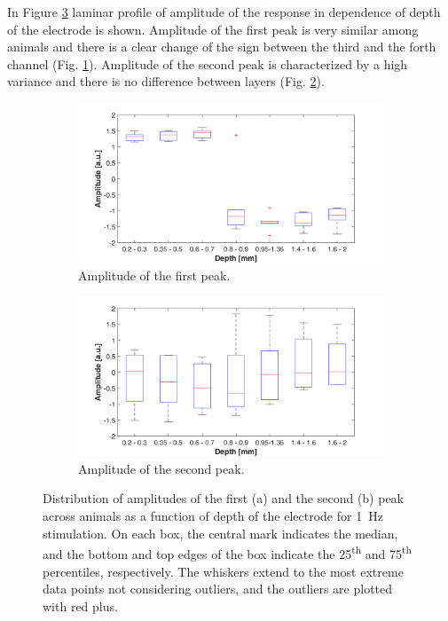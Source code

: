 \documentclass{pracalicmgr}
\begin{document}
     In Figure \ref{rys:profil_1Hz_amp} laminar profile of amplitude of the response in dependence of depth of the electrode is shown. Amplitude of the first peak is very similar among animals and there is a clear change of the sign between the third and the forth channel (Fig. \ref{rys:profil_1Hz_amp1}). Amplitude of the second peak is characterized by a high variance and there is no difference between layers (Fig. \ref{rys:profil_1Hz_amp2}).
     
    \begin{figure}[H]
    	\begin{subfigure}{.5\textwidth}
    		\centering
    		\includegraphics[width=1.\linewidth]{profile_1Hz_amp.png}
    		\caption{Amplitude of the first peak.}
    		\label{rys:profil_1Hz_amp1}
    	\end{subfigure}%
    	\begin{subfigure}{.5\textwidth}
    		\centering
    		\includegraphics[width=1.\linewidth]{profile_1Hz_amp2.png}
    		\caption{Amplitude of the second peak.}
    		\label{rys:profil_1Hz_amp2}
    	\end{subfigure}
    	
    	\caption{Distribution of amplitudes of the first (a) and the second (b) peak across animals as a function of depth of the electrode for 1~Hz stimulation. On each box, the central mark indicates the median, and the bottom and top edges of the box indicate the 25\textsuperscript{th} and 75\textsuperscript{th} percentiles, respectively. The whiskers extend to the most extreme data points not considering outliers, and the outliers are plotted with red plus.}
    	\label{rys:profil_1Hz_amp}
    \end{figure}
\end{document}
